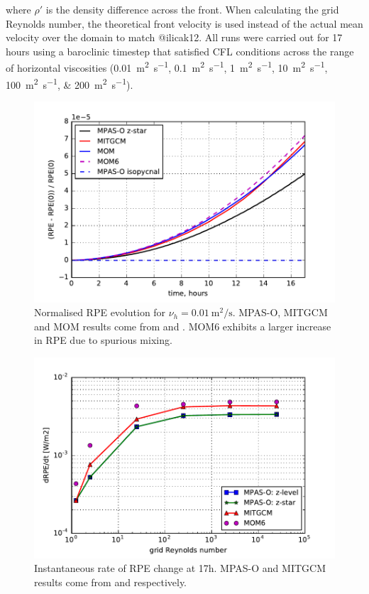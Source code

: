 
where $\rho'$ is the density difference across the front. When calculating the grid Reynolds number, the theoretical front velocity is used instead of the actual mean velocity over the domain to match @ilicak12. All runs were carried out for 17 hours using a baroclinic timestep that satisfied CFL conditions across the range of horizontal viscosities (\SIlist{0.01;0.1;1;10;100;200}{\square\metre\per\second}).

\begin{figure}
  \includegraphics{../plots/lock_exchange_rpe_norm.pdf}
  \caption{\label{fig:lock-rpenorm} Normalised RPE evolution for $\nu_h = \SI{0.01}{\square\metre\per\second}$. MPAS-O, MITGCM and MOM results come from \citet{petersen15} and \citet{ilicak12}. MOM6 exhibits a larger increase in RPE due to spurious mixing.}
\end{figure}


\begin{figure}
  \includegraphics{../plots/lock_exchange_drpe.pdf}
  \caption{\label{fig:lock-drpe} Instantaneous rate of RPE change at 17h. MPAS-O and MITGCM results come from \citet{petersen15} and \citet{ilicak12} respectively.}
\end{figure}

